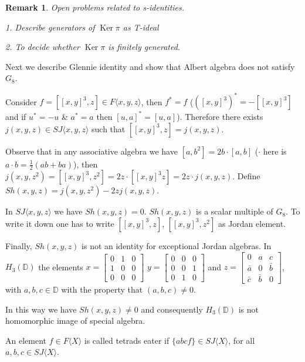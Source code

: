 \documentclass{article}
\newtheorem{remark}[theorem]{Remark}
\begin{document}
\begin{remark}
Open problems related to s-identities.  

1. Describe generators of $\operatorname{Ker} \pi$ as T-ideal  

2. To decide whether $\operatorname{Ker} \pi$ is finitely generated.  
\end{remark}

Next we describe Glennie identity and show that Albert algebra does not satisfy $G_8$.  

Consider $f = [[x, y]^3, z] \in F \langle x, y, z \rangle$, then $f^* = f$ ($([x, y]^3)^* = - [[x, y]^3]$ and if $u^* = -u$ \& $a^* = a$ then $[u, a]^* = [u, a]$). Therefore there exists $j(x, y, z) \in SJ \langle x, y, z \rangle$ such that $[[x, y]^3, z] = j(x, y, z)$.  

Observe that in any associative algebra we have $[a, b^2] = 2b \cdot [a, b] $ ($ \cdot $ here is $ a \cdot b=\frac{1}{2}(ab+ba) $), then $j(x, y, z^2) = [[x, y]^3, z^2] = 2z \cdot [[x, y]^3 z] = 2z \cdot j(x, y, z)$. Define $Sh(x, y, z) = j(x, y, z^2) - 2z j(x, y, z)$. 

In $SJ \langle x, y, z \rangle$ we have $Sh(x, y, z) = 0$. $Sh(x, y, z)$ is a scalar multiple of $G_8$. To write it down one has to write $[[x, y]^3, z]$, $ [[x, y]^3, z^2] $ as Jordan element.  

Finally, $Sh(x, y, z)$ is not an identity for exceptional Jordan algebras.  
In $H_3(\mathbb{D})$ the elements $x = \begin{bmatrix} 0 & 1 & 0 \\ 1 & 0 & 0 \\ 0 & 0 & 0 \end{bmatrix}$ $y = \begin{bmatrix} 0 & 0 & 0 \\ 0 & 0 & 1\\ 0 & 1 & 0 \end{bmatrix}$ and $z = \begin{bmatrix} 0 & a & c \\ \bar{a} & 0 & \bar{b} \\ \bar{c} & \bar{b} & 0 \end{bmatrix}$, with $a, b, c \in \mathbb{D}$ with the property that $(a, b, c) \neq 0$.  

In this way we have $Sh(x, y, z) \neq 0$ and consequently $H_3(\mathbb{D})$ is not homomorphic image of special algebra.  

\begin{definition} 
 An element $f \in F\langle X \rangle$ is called tetrads eater if $\{abcf\} \in SJ\langle X \rangle$, for all $a, b, c \in SJ\langle X \rangle$.  
\end{definition}
\end{document}
